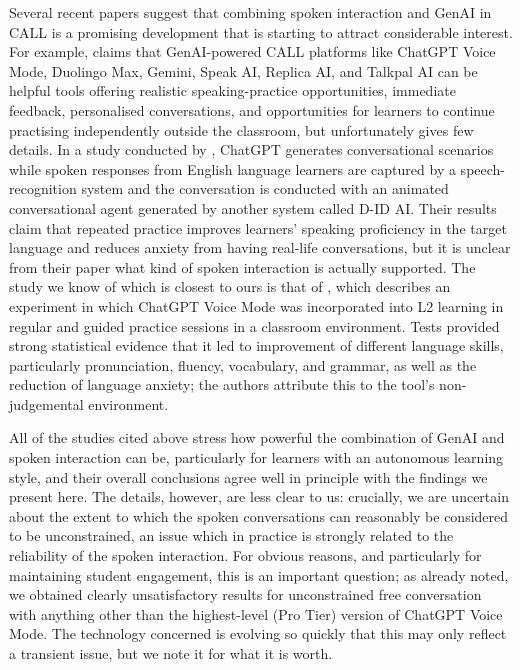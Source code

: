 \documentclass[11pt,a4paper]{article}
\begin{document}
Several recent papers suggest that combining spoken interaction and GenAI in CALL is a promising development that is starting to attract considerable interest. For example, \citet[p.~122]{Savvidou2026} claims that GenAI-powered CALL platforms like ChatGPT Voice Mode, Duolingo Max, Gemini, Speak AI, Replica AI, and Talkpal AI can be helpful tools offering realistic speaking-practice opportunities, immediate feedback, personalised conversations, and opportunities for learners to continue practising independently outside the classroom, but unfortunately gives few details. In a study conducted by \citet{LuEtAl2026}, ChatGPT generates conversational scenarios while spoken responses from English language learners are captured by a speech-recognition system and the conversation is conducted with an animated conversational agent generated by another system called D-ID AI. Their results claim that repeated practice improves learners' speaking proficiency in the target language and reduces anxiety from having real-life conversations, but it is unclear from their paper what kind of spoken interaction is actually supported. The study we know of which is closest to ours is that of \citet{CarreraNunezEtAl2025}, which describes an experiment in which ChatGPT Voice Mode was incorporated into L2 learning in regular and guided practice sessions in a classroom environment. Tests provided strong statistical evidence that it led to improvement of different language skills, particularly pronunciation, fluency, vocabulary, and grammar, as well as the reduction of language anxiety; the authors attribute this to the tool's non-judgemental environment.

All of the studies cited above stress how powerful the combination of GenAI and spoken interaction can be, particularly for learners with an autonomous learning style, and their overall conclusions agree well in principle with the findings we present here. The details, however, are less clear to us: crucially, we are uncertain about the extent to which the spoken conversations can reasonably be considered to be unconstrained, an issue which in practice is strongly related to the reliability of the spoken interaction. For obvious reasons, and particularly for maintaining student engagement, this is an important question; as already noted, we obtained clearly unsatisfactory results for unconstrained free conversation with anything other than the highest-level (Pro Tier) version of ChatGPT Voice Mode. The technology concerned is evolving so quickly that this may only reflect a transient issue, but we note it for what it is worth.
\end{document}
